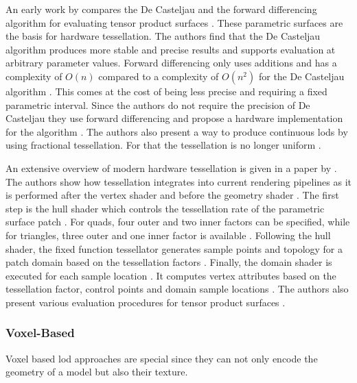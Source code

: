 An early work by \citeauthor{moreton_tessellation} compares the De Casteljau and the forward differencing algorithm for evaluating tensor product surfaces \cite{moreton_tessellation}.
These parametric surfaces are the basis for hardware tessellation.
The authors find that the De Casteljau algorithm produces more stable and precise results and supports evaluation at arbitrary parameter values.
Forward differencing only uses additions and has a complexity of $O(n)$ compared to a complexity of $O(n^2)$ for the De Casteljau algorithm \cite{moreton_tessellation}.
This comes at the cost of being less precise and requiring a fixed parametric interval.
Since the authors do not require the precision of De Casteljau they use forward differencing and propose a hardware implementation for the algorithm \cite{moreton_tessellation}.
The authors also present a way to produce continuous \acp{lod} by using fractional tessellation.
For that the tessellation is no longer uniform \cite{moreton_tessellation}.

An extensive overview of modern hardware tessellation is given in a paper by \citeauthor{niessner_tessellation} \cite{niessner_tessellation}.
The authors show how tessellation integrates into current rendering pipelines as it is performed after the vertex shader and before the geometry shader \cite{niessner_tessellation}.
The first step is the hull shader which controls the tessellation rate of the parametric surface patch \cite{niessner_tessellation}.
For quads, four outer and two inner factors can be specified, while for triangles, three outer and one inner factor is available \cite{niessner_tessellation}.
Following the hull shader, the fixed function tessellator generates sample points and topology for a patch domain based on the tessellation factors \cite{niessner_tessellation}.
Finally, the domain shader is executed for each sample location \cite{niessner_tessellation}.
It computes vertex attributes based on the tessellation factor, control points and domain sample locations \cite{niessner_tessellation}.
The authors also present various evaluation procedures for tensor product surfaces \cite{niessner_tessellation}.

\subsubsection*{Voxel-Based}
Voxel based \ac{lod} approaches are special since they can not only encode the geometry of a model but also their texture.

